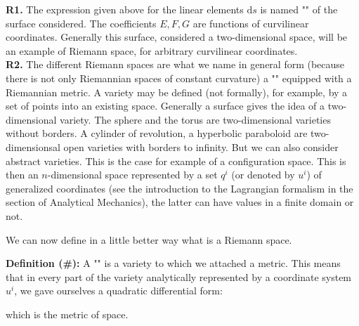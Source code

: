 	\begin{tcolorbox}[title=Remark,colframe=black,arc=10pt]
	\textbf{R1.} The expression given above for the linear elements $\mathrm{d}s$ is named "" of the surface considered. The coefficients $E, F, G$ are functions of curvilinear coordinates. Generally this surface, considered a two-dimensional space, will be an example of Riemann space, for arbitrary curvilinear coordinates.\\
	
	\textbf{R2.} The different Riemann spaces are what we name in general form (because there is not only Riemannian spaces of constant curvature) a "" equipped with a Riemannian metric. A variety may be defined (not formally), for example, by a set of points into an existing space. Generally a surface gives the idea of a two-dimensional variety. The sphere and the torus are two-dimensional varieties without borders. A cylinder of revolution, a hyperbolic paraboloid are two-dimensionsal open varieties with borders to infinity. But we can also consider abstract varieties. This is the case for example of a configuration space. This is then an $n$-dimensional space represented by a set $q^i$ (or denoted by $u^i$) of generalized coordinates (see the introduction to the Lagrangian formalism in the section of Analytical Mechanics), the latter can have values in a finite domain or not.
	\end{tcolorbox}
	
	We can now define in a little better way what is a Riemann space.
	
	\textbf{Definition (\#\mydef):}	A "" is a variety to which we attached a metric. This means that in every part of the variety analytically represented by a coordinate system $u^i$, we gave ourselves a quadratic differential form:
	
	which is the metric of space.
	
